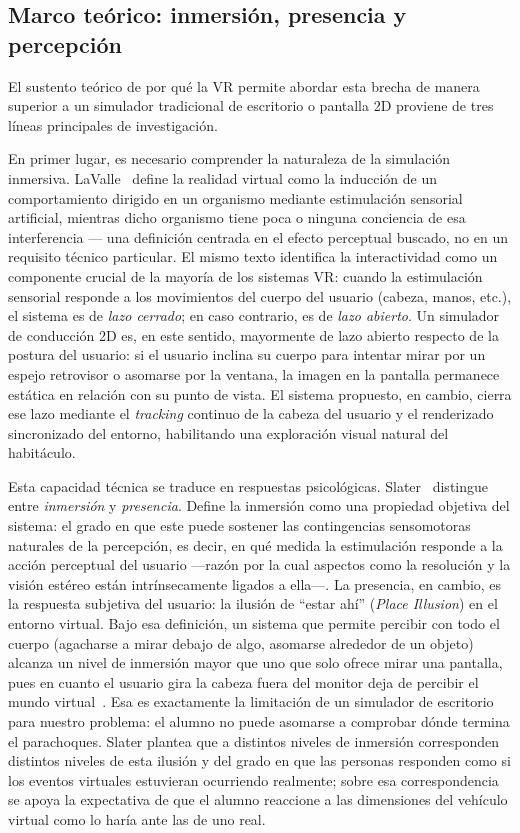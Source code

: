 \documentclass[conference]{IEEEtran}
\begin{document}
\subsection{Marco teórico: inmersión, presencia y percepción}

El sustento teórico de por qué la VR permite abordar esta brecha de manera superior a un simulador tradicional de escritorio o pantalla 2D proviene de tres líneas principales de investigación.

En primer lugar, es necesario comprender la naturaleza de la simulación inmersiva. LaValle~\cite{lavalle2016} define la realidad virtual como la inducción de un comportamiento dirigido en un organismo mediante estimulación sensorial artificial, mientras dicho organismo tiene poca o ninguna conciencia de esa interferencia — una definición centrada en el efecto perceptual buscado, no en un requisito técnico particular. El mismo texto identifica la interactividad como un componente crucial de la mayoría de los sistemas VR: cuando la estimulación sensorial responde a los movimientos del cuerpo del usuario (cabeza, manos, etc.), el sistema es de \textit{lazo cerrado}; en caso contrario, es de \textit{lazo abierto}. Un simulador de conducción 2D es, en este sentido, mayormente de lazo abierto respecto de la postura del usuario: si el usuario inclina su cuerpo para intentar mirar por un espejo retrovisor o asomarse por la ventana, la imagen en la pantalla permanece estática en relación con su punto de vista. El sistema propuesto, en cambio, cierra ese lazo mediante el \textit{tracking} continuo de la cabeza del usuario y el renderizado sincronizado del entorno, habilitando una exploración visual natural del habitáculo.

Esta capacidad técnica se traduce en respuestas psicológicas. Slater~\cite{slater2018} distingue entre \textit{inmersión} y \textit{presencia}. Define la inmersión como una propiedad objetiva del sistema: el grado en que este puede sostener las contingencias sensomotoras naturales de la percepción, es decir, en qué medida la estimulación responde a la acción perceptual del usuario —razón por la cual aspectos como la resolución y la visión estéreo están intrínsecamente ligados a ella—. La presencia, en cambio, es la respuesta subjetiva del usuario: la ilusión de ``estar ahí'' (\textit{Place Illusion}) en el entorno virtual. Bajo esa definición, un sistema que permite percibir con todo el cuerpo (agacharse a mirar debajo de algo, asomarse alrededor de un objeto) alcanza un nivel de inmersión mayor que uno que solo ofrece mirar una pantalla, pues en cuanto el usuario gira la cabeza fuera del monitor deja de percibir el mundo virtual~\cite{slater2018}. Esa es exactamente la limitación de un simulador de escritorio para nuestro problema: el alumno no puede asomarse a comprobar dónde termina el parachoques. Slater plantea que a distintos niveles de inmersión corresponden distintos niveles de esta ilusión y del grado en que las personas responden como si los eventos virtuales estuvieran ocurriendo realmente; sobre esa correspondencia se apoya la expectativa de que el alumno reaccione a las dimensiones del vehículo virtual como lo haría ante las de uno real.
\end{document}
